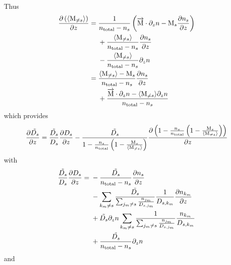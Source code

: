 Thus
\begin{equation}
\begin{split}
\frac{\partial\left(\langle\text{M}_{\neq s}\rangle\right)}{\partial z} = 
        &\;   \frac{1}{n_\text{total} - n_s}\left( \overrightarrow{\text{M}}\cdot\partial_{z}{n} - \text{M}_s\frac{\partial n_s}{\partial z}\right) \\
        &\;  + \frac{\langle\text{M}_{\neq s}\rangle}{n_\text{total} - n_s} \frac{\partial n_s}{\partial z} \\
        &\;  - \frac{\langle\text{M}_{\neq s}\rangle}{n_\text{total} - n_s} \partial_{z}{n} \\
=       &\;    \frac{\langle\text{M}_{\neq s}\rangle - \text{M}_s}{n_\text{total} - n_s} \frac{\partial n_s}{\partial z} \\
        &\;  + \frac{\overrightarrow{\text{M}}\cdot\partial_{z}{n} - \langle\text{M}_{\neq s}\rangle \partial_{z}{n}}{n_\text{total} - n_s}
\end{split}
\end{equation}
which provides
\begin{equation}
\frac{\partial\tilde{D_s}}{\partial z}  = \frac{\tilde{D_s}}{D_s}\frac{\partial D_s}{\partial z}
                             - \frac{\tilde{D_s}}{1-\frac{n_s}{n_\text{total}}\left(1 - \frac{\text{M}_s}{\langle\text{M}_{\neq s}\rangle}\right)}
                                \frac{\partial\left(1-\frac{n_s}{n_\text{total}}\left(1 - \frac{\text{M}_s}{\langle\text{M}_{\neq s}\rangle}\right)\right)}{\partial z}
\end{equation}
with
\begin{equation}
\begin{split}
\frac{\tilde{D_s}}{D_s}\frac{\partial D_s}{\partial z}
                  = &\; - \frac{\tilde{D_s}}{n_\text{total} - n_s}\frac{\partial n_s}{\partial z} \\
                    &\; - \sum_{k_m\neq s}\frac{\tilde{D_s}}{\sum_{j_m \neq s}\frac{n_{j_m}}{D_{s,j_m}}}
                                \frac{1}{D_{s,k_m}} \frac{\partial n_{k_m}}{\partial z} \\
                    &\; +  \tilde{D_s}\partial_{z}{n} \sum_{k_m\neq s}
                           \frac{1}{\sum_{j_m \neq s}\frac{n_{j_m}}{D_{s,j_m}}}
                                    \frac{n_{k_m}}{D_{s,k_m}} \\
                    &\; + \frac{\tilde{D_s}}{n_\text{total} - n_s}\partial_{z}{n} \\
\end{split}
\end{equation}
and
